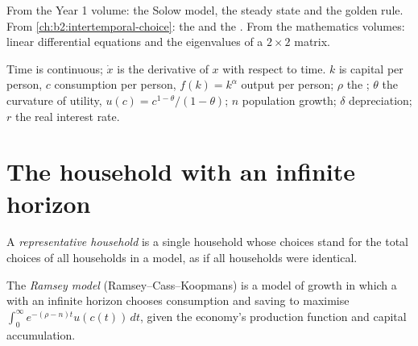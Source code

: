 \begin{recall}
From the Year 1 volume: the Solow model, the steady state and the golden rule. From \cref{ch:b2:intertemporal-choice}: the  and
the . From the mathematics volumes: linear differential equations and the
eigenvalues of a $2 \times 2$ matrix.
\end{recall}

\begin{notation}\label{not:b2:ramsey-model:symbols}
Time is continuous; $\dot x$ is the derivative of $x$ with respect to time. $k$ is capital per person, $c$ consumption per person, $f(k) = k^\alpha$ output per person;
$\rho$ the ; $\theta$ the curvature of utility, $u(c) = c^{1-\theta}/(1 - \theta)$; $n$ population growth; $\delta$ depreciation; $r$ the real interest rate.
\end{notation}

\section{The household with an infinite horizon}\label{sec:b2:ramsey-model:household}

\begin{definition}\label{def:b2:ramsey-model:representative-household}
A \emph{representative household} is a single household whose choices stand for the
total choices of all households in a model, as if all households were identical.
\end{definition}

\begin{definition}\label{def:b2:ramsey-model:ramsey}
The \emph{Ramsey model} (Ramsey--Cass--Koopmans) is a model of growth in which a  with an infinite horizon chooses consumption and saving to maximise $\int_0^\infty e^{-(\rho - n)t}u(c(t))\,dt$, given the economy's production
function and capital accumulation.
\end{definition}

